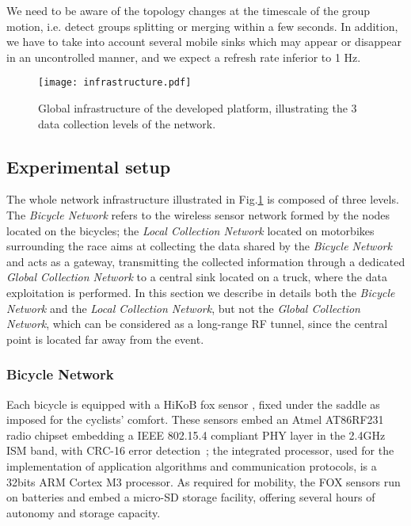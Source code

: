\documentclass{sig-alternate}
\begin{document}
We need to be aware of the topology changes at the timescale of the group motion, i.e. detect groups splitting or merging within a few seconds.
In addition, we have to take into account several mobile sinks which may appear or disappear in an uncontrolled manner, and we expect a refresh rate inferior to 1 Hz.

\begin{figure}[t!]
    \begin{center}
        \texttt{[image: infrastructure.pdf]}
    \end{center}
    \caption{Global infrastructure of the developed platform, illustrating the 3 data collection levels of the network.}
    \label{fig:infra}
\end{figure}

\newcommand{\fox}{\sc fox}
\newcommand{\lion}{\sc lion}
\newcommand{\ed}{\sc ed}
\newcommand{\rssi}{\sc rssi}


\subsection{Experimental setup}
The whole network infrastructure illustrated in Fig.\ref{fig:infra} is composed of three levels. The \emph{Bicycle Network} refers to the wireless sensor network formed by the nodes located on the bicycles; the \emph{Local Collection Network}  located on motorbikes surrounding the race aims at collecting the data shared by the \emph{Bicycle Network} and acts as a gateway, transmitting the collected information through a dedicated \emph{Global Collection Network} to a central sink located on a truck, where the data exploitation is performed. In this section we describe in details both the \emph{Bicycle Network} and the \emph{Local Collection Network}, but not the \emph{Global Collection Network}, which can be considered as a long-range RF tunnel, since the central point is located far away from the event.

\subsubsection{Bicycle Network}
Each bicycle is equipped with a HiKoB {\fox} sensor \cite{hikobfox}, fixed under the saddle as imposed for the cyclists' comfort. These sensors embed an Atmel AT86RF231 radio chipset embedding a IEEE 802.15.4 compliant PHY layer in the 2.4GHz ISM band, with CRC-16 error detection~\cite{atmel}; the integrated processor, used for the implementation of application algorithms and communication protocols, is a 32bits ARM Cortex M3 processor. As required for mobility, the FOX sensors run on batteries and embed a micro-SD storage facility, offering several hours of autonomy and storage capacity.
\end{document}
